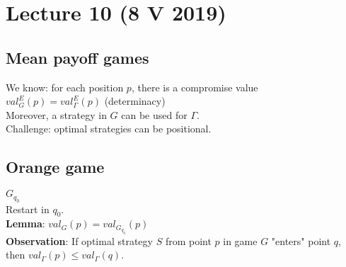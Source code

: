\section{Lecture 10 (8 V 2019)}
\subsection*{Mean payoff games}
We know: for each position $p$, there is a compromise value\\
$val^E_G(p) = val^E_{\Gamma}(p)$ (determinacy)\\
Moreover, a strategy in $G$ can be used for $\Gamma$.\\
Challenge: optimal strategies can be positional.

\subsection*{Orange game}
$G_{q_0}$\\
Restart in $q_0$.\\
\textbf{Lemma}: $val_{G}(p) = val_{G_{q_0}}(p)$\\
\textbf{Observation}: If optimal strategy $S$ from point $p$ in game $G$
"enters" point $q$, then $val_{\Gamma}(p) \leq val_{\Gamma}(q)$.